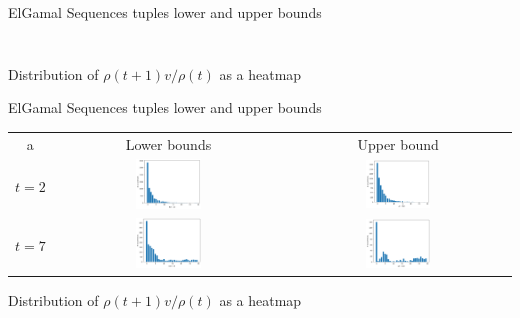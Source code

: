 \begin{frame}{ElGamal Sequences tuples lower and upper bounds}
\begin{columns}
\begin{column}{0.45\textwidth}
\begin{figure}
            \end{figure}
        \end{column}
    \end{columns}
    \begin{center}
                Distribution of $\rho(t+1)v/\rho(t)$ as a heatmap
    \end{center}
\end{frame}

\begin{frame}{ElGamal Sequences tuples lower and upper bounds}
    \begin{tabular}{ccc}
        a & Lower bounds & Upper bound \\
        $t = 2$ & 
        \includegraphics[width=0.3\textwidth]{figures/LB0t2with012outliers.png} &
        \includegraphics[width=0.3\textwidth]{figures/UBt2with005outliers.png} \\
        $t = 7$ & 
        \includegraphics[width=0.3\textwidth]{figures/LB0t7with5975outliers.png} &
        \includegraphics[width=0.3\textwidth]{figures/UBt7with9356outliers.png} 
    \end{tabular}
    \begin{center}
                Distribution of $\rho(t+1)v/\rho(t)$ as a heatmap
    \end{center}
\end{frame}

